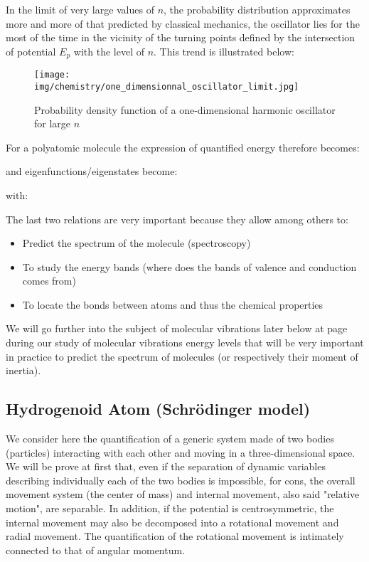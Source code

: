 	In the limit of very large values of $n$, the probability distribution approximates more and more of that predicted by classical mechanics, the oscillator lies for the most of the time in the vicinity of the turning points defined by the intersection of potential $E_{p}$ with the level of $n$. This trend is illustrated below:
	\begin{figure}[H]
		\begin{center}
		\texttt{[image: img/chemistry/one\_dimensionnal\_oscillator\_limit.jpg]}
		\end{center}	
		\caption{Probability density function of a one-dimensional harmonic oscillator for large $n$}
	\end{figure}
	For a polyatomic molecule the expression of quantified energy therefore becomes:
	
	and eigenfunctions/eigenstates become:
	
	with:
	
	The last two relations are very important because they allow among others to:
	\begin{itemize}
		\item Predict the spectrum of the molecule (spectroscopy)
		\item To study the energy bands (where does the bands of valence and conduction comes from)
		\item To locate the bonds between atoms and thus the chemical properties
	\end{itemize}

	We will go further into the subject of molecular vibrations later below at page \pageref{molecular rotational energy levels} during our study of molecular vibrations energy levels that will be very important in practice to predict the spectrum of molecules (or respectively their moment of inertia).
	
	\subsection{Hydrogenoid Atom (Schrödinger model)}
	We consider here the quantification of a generic system made of two bodies (particles) interacting with each other and moving in a three-dimensional space. We will be prove at first that, even if the separation of dynamic variables describing individually each of the two bodies is impossible, for cons, the overall movement system (the center of mass) and internal movement, also said "relative motion", are separable. In addition, if the potential is centrosymmetric, the internal movement may also be decomposed into a rotational movement and radial movement. The quantification of the rotational movement is intimately connected to that of angular momentum.
	
